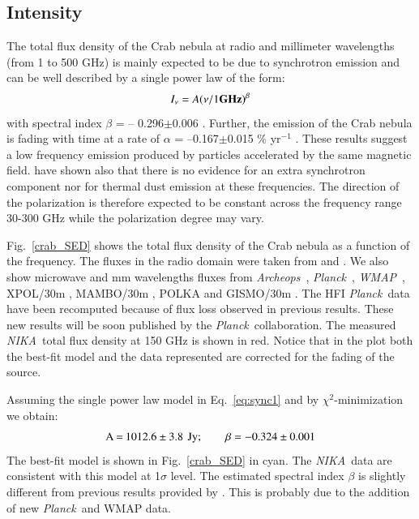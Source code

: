 \documentclass[twocolumn,traditabstract]{aa}
\def\NIKA{\textit{NIKA}}
\def\Archeops{\textit{Archeops}}
\def\Planck{\textit{Planck}}
\def\WMAP{\textit{WMAP}}
\begin{document}
\subsection{Intensity}
The total flux density of the Crab nebula at radio and millimeter
wavelengths (from 1 to 500 GHz) is mainly expected to be due to synchrotron emission and can be
well described by a single power law of the form:
\begin{equation}
I_{\nu} = A(\nu / 1 {\bf GHz})^{\beta}
\label{eq:sync1}
\end{equation}
with spectral index $\beta$ = -- 0.296$\pm$0.006 \citep{baars1977absolute,macias2010}. Further, the emission of the Crab nebula is fading with time at a rate of $\alpha$ = --0.167$\pm$0.015 \% yr$^{-1}$ \citep{aller1985decrease}. 
These results suggest a low frequency emission produced by particles accelerated by the same magnetic field. \cite{macias2010} have shown also that there is no evidence for an extra synchrotron component nor for thermal dust emission at these frequencies. The direction of the polarization is therefore expected to be constant across the frequency range 30-300 GHz while the polarization degree may vary.

Fig.~\ref{crab_SED} shows the total flux density of the Crab nebula as a function of the frequency. The fluxes in the radio domain were taken from \cite{dmitrenko1970absolute} and \cite{1971IzVUZ..14..157V}. We also show microwave and mm wavelengths fluxes from  \Archeops\ \citep{macias2007archeops}, \Planck\ \citep{2015arXiv150702058P}, \WMAP\ \citep{2011ApJS..192...19W}, XPOL/30m \citep{aumont2010}, MAMBO/30m \citep{2002A&A...386.1044B}, POLKA \citep{2014PASP..126.1027W} and GISMO/30m \citep{2011ApJ...734...54A}. The HFI \Planck\ data have been recomputed because of flux loss observed in previous results. These new results will be soon published by the \Planck\ collaboration. The measured \NIKA\ total flux density at 150 GHz is shown in red. 
Notice that in the plot both the best-fit model and the data represented are corrected for the fading of the source.

Assuming the single power law model in Eq.~\ref{eq:sync1} and
by $\chi^2$-minimization we obtain:
$$\setlength\arraycolsep{0.1em}
 \begin{array}{rclcl}
  \textrm{A}&=& 1012.6\pm3.8 & & \textrm{Jy}; \quad \quad  \textrm{$\beta$} = - 0.324\pm0.001\\
 \end{array}
$$
The best-fit model is shown in Fig.~\ref{crab_SED} in cyan.
The \NIKA\ data are consistent with this model at 1$\sigma$ level.
The estimated spectral index $\beta$ is slightly different from previous results provided by \cite{macias2010}. This 
is probably due to the addition of new \Planck\ and  WMAP data.
\end{document}
